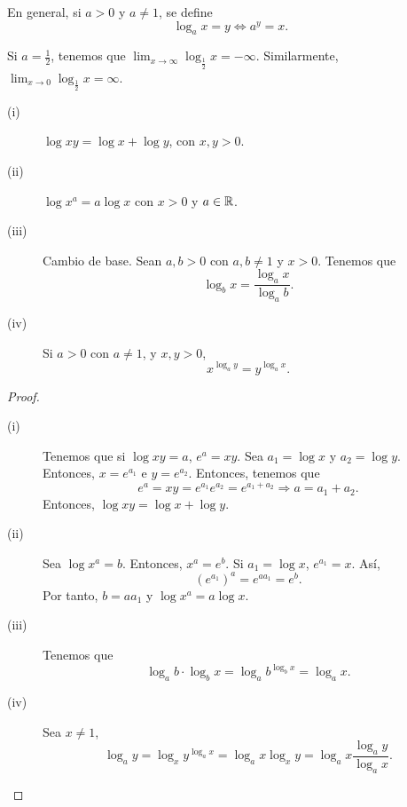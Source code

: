 \begin{observation}
\normalfont En general, si $\displaystyle a > 0 $ y $\displaystyle a\neq 1 $, se define 
\[\log_{a}x = y \iff a^{y} = x  .\]
\end{observation}

\begin{eg}
\normalfont Si $\displaystyle a = \frac{1}{2} $, tenemos que $\displaystyle \lim_{x \to \infty}\log_{\frac{1}{2}}x = -\infty $. Similarmente, $\displaystyle \lim_{x \to 0}\log_{\frac{1}{2}}x= \infty $.
\end{eg}

\begin{fprop}[]
\normalfont 
\begin{description}
\item[(i)] $\displaystyle \log xy = \log x + \log y $, con $\displaystyle x,y > 0 $.
\item[(ii)] $\displaystyle \log x^{a} = a \log x $ con $\displaystyle x > 0 $ y $\displaystyle a \in \mathbb{R} $.
\item[(iii)] Cambio de base. Sean $\displaystyle a,b > 0 $ con $\displaystyle a,b \neq 1 $ y $\displaystyle x > 0 $. Tenemos que
	\[\log_{b}x = \frac{\log_{a}x}{\log_{a}b} .\]
\item[(iv)] Si $\displaystyle a > 0 $ con $\displaystyle a \neq 1 $, y $\displaystyle x, y > 0 $,
	\[x^{\log_{a}y} = y^{\log_{a}x} .\]
\end{description}
\end{fprop}

\begin{proof}
\begin{description}
\item[(i)] Tenemos que si $\displaystyle \log xy = a $, $\displaystyle e^{a} = xy $. Sea $\displaystyle a_{1} = \log x  $ y $\displaystyle a_{2} = \log y $. Entonces, $\displaystyle x = e^{a_{1}} $ e $\displaystyle y = e^{a_{2}} $. Entonces, tenemos que
	\[e^{a} = xy = e^{a_{1}}e^{a_{2}} = e^{a_{1}+a_{2}} \Rightarrow a = a_{1} + a_{2} .\]
Entonces, $\displaystyle \log xy = \log x + \log y $.
\item[(ii)] Sea $\displaystyle \log x^{a} = b $. Entonces, $\displaystyle x^{a} = e^{b} $. Si $\displaystyle a_{1} = \log x $, $\displaystyle e^{a_{1}} = x $. Así, 
	\[\left(e^{a_{1}}\right)^{a} = e^{a a_{1}} = e^{b} .\]
Por tanto, $\displaystyle b = a a_{1} $ y $\displaystyle \log x^{a} = a\log x $.
\item[(iii)] Tenemos que 
	\[\log_{a}b \cdot \log_{b}x = \log_{a}b^{\log_{b}x} = \log_{a}x .\]
\item[(iv)] Sea $\displaystyle x \neq 1 $,
	\[\log_{a}y = \log_{x}y^{\log_{a}x} = \log_{a}x\log_{x}y = \log_{a}x\frac{\log_{a}y}{\log_{a}x} .\] 
\end{description}
\end{proof}

